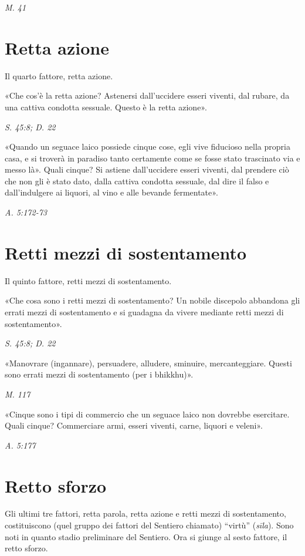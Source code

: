 \emph{M. 41}


\hypertarget{x-retta-azione}{\section*{Retta azione}}
 Il quarto fattore, retta azione.


 «Che cos’è la retta azione? Astenersi dall’uccidere esseri
viventi, dal rubare, da una cattiva condotta sessuale. Questo è la retta
azione».


\emph{S. 45:8; D. 22}


«Quando un seguace laico possiede cinque cose, egli vive fiducioso nella
propria casa, e si troverà in paradiso tanto certamente come se fosse
stato trascinato via e messo là». Quali cinque? Si astiene dall’uccidere
esseri viventi, dal prendere ciò che non gli è stato dato, dalla cattiva
condotta sessuale, dal dire il falso e dall’indulgere ai liquori, al
vino e alle bevande fermentate».


\emph{A. 5:172-73}


\hypertarget{x-retti-mezzi-di-sostentamento}{\section*{Retti mezzi di sostentamento}}
 Il quinto fattore, retti mezzi di sostentamento.


 «Che cosa sono i retti mezzi di sostentamento? Un nobile
discepolo abbandona gli errati mezzi di sostentamento e si guadagna da
vivere mediante retti mezzi di sostentamento».


\emph{S. 45:8; D. 22}


«Manovrare (ingannare), persuadere, alludere, sminuire, mercanteggiare.
Questi sono errati mezzi di sostentamento (per i bhikkhu)».


\emph{M. 117}


«Cinque sono i tipi di commercio che un seguace laico non dovrebbe
esercitare. Quali cinque? Commerciare armi, esseri viventi, carne,
liquori e veleni».


\emph{A. 5:177}


\hypertarget{x-retto-sforzo}{\section*{Retto sforzo}}
 Gli ultimi tre fattori, retta parola, retta azione e
retti mezzi di sostentamento, costituiscono (quel gruppo dei fattori del
Sentiero chiamato) “virtù” (\emph{sīla}). Sono noti in quanto stadio
preliminare del Sentiero. Ora si giunge al sesto fattore, il retto
sforzo.


